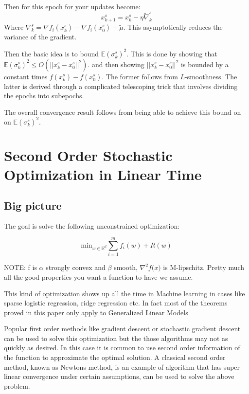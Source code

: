 \documentclass[12pt]{report}
\begin{document}
Then for this epoch for your updates become:
\begin{equation}
	x^s_{k+1} = x_k^s - \eta \tilde{\nabla}_k^s
\end{equation}
Where $\nabla_k^s = \nabla f_i(x_k^s) - \nabla f_i(x_0^s) + \tilde{\mu}$.  This asymptotically reduces the variance of the gradient.

Then the basic idea is to bound $\mathbb{E}(\sigma_k^s)^2$. This is done by showing that $\mathbb{E}(\sigma_k^s)^2 \leq O(||x_k^s - x_0^s||^2)$. and then showing $||x_k^s - x_0^s||^2$ is bounded by a constant times $f(x_k^s) - f(x_0^s)$. The former follows from $L$-smoothness. The latter is derived through a complicated telescoping trick that involves dividing the epochs into subepochs.

The overall convergence result follows from being able to achieve this bound on on $\mathbb{E}(\sigma_k^s)^2$.


\section{Second Order Stochastic Optimization in Linear Time}

\subsection{Big picture}

The goal is solve the following unconstrained optimization:

$$ \text{min}_{w \in \mathbb{R}^d } \sum_{i=1}^m f_i(w) + R(w) $$

\color{blue}
NOTE: f is $\alpha$ strongly convex and $\beta$ smooth, $\nabla^2 f\big( x) $ is M-lipschitz. Pretty much all the good properties you want a function to have we assume. \\
\color{black}

This kind of optimization shows up all the time in Machine learning in cases like sparse logistic regression, ridge regression etc. In fact most of the theorems proved in this paper only apply to Generalized Linear Models\newline

Popular first order methods like gradient descent or stochastic gradient descent can be used to solve this optimization but the those algorithms may not as quickly as desired. In this case it is common to use second order information of the function to approximate the optimal solution. A classical second order method, known as Newtons method, is an example of algorithm that has super linear convergence under certain assumptions, can be used to solve the above problem. \newline
\end{document}
